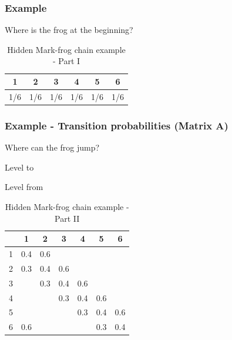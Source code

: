 \documentclass[xcolor=dvipsnames, compress]{beamer}
\begin{document}
\begin{frame}
\frametitle{Example}
Where is the frog at the beginning?
\begin{center}
	\begin{table}
		\begin{centering}
			\begin{tabular}{|c|c|c|c|c|c|}
				\hline 
				\rowcolor{lightgray}
				1 & 2 & 3 & 4 & 5 & 6\tabularnewline
				\hline 
				\hline 
				1/6 & 1/6 & 1/6 & 1/6 & 1/6 & 1/6\tabularnewline
				\hline 
			\end{tabular}
			\par\end{centering}
		\caption{Hidden Mark-frog chain example - Part I}
	\end{table}
	\par\end{center}
\end{frame}

\begin{frame}
\frametitle{Example - Transition probabilities (Matrix A)}
Where can the frog jump? 

\begin{center}
	\begin{table}
		\begin{centering}
			Level to
			\par\end{centering}
		\begin{centering}
			Level from%
			\begin{tabular}{|c|c|c|c|c|c|c|}
				\hline 
				\rowcolor{lightgray}
				& 1 & 2 & 3 & 4 & 5 & 6\tabularnewline
				\hline 
				\hline 
				1 & 0.4 & 0.6 &  &  &  & \tabularnewline
				\hline 
				2 & 0.3 & 0.4 & 0.6 &  &  & \tabularnewline
				\hline 
				3 &  & 0.3 & 0.4 & 0.6 &  & \tabularnewline
				\hline 
				4 &  &  & 0.3 & 0.4 & 0.6 & \tabularnewline
				\hline 
				5 &  &  &  & 0.3 & 0.4 & 0.6\tabularnewline
				\hline 
				6 & 0.6 &  &  &  & 0.3 & 0.4\tabularnewline
				\hline 
			\end{tabular}
			\par\end{centering}
		\caption{Hidden Mark-frog chain example - Part II}
		
	\end{table}
	\par\end{center}
\end{frame}
\end{document}
